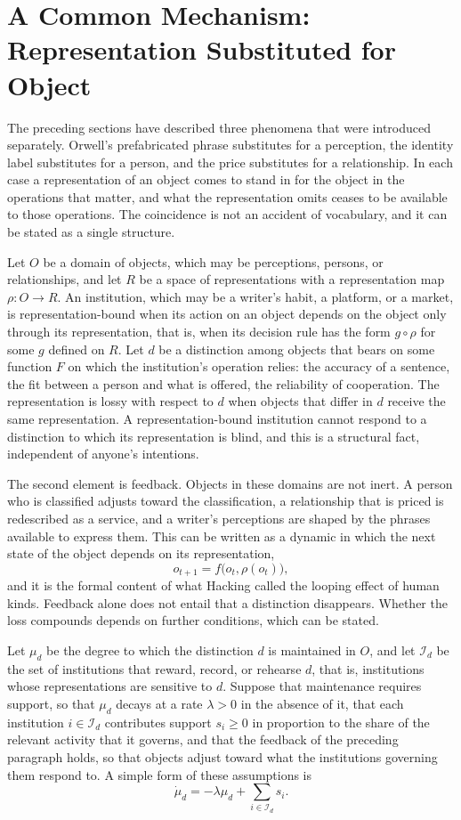 \documentclass[12pt]{article}
\begin{document}
\section{A Common Mechanism: Representation Substituted for Object}
\label{sec:mechanism}

The preceding sections have described three phenomena that were introduced separately. Orwell's prefabricated phrase substitutes for a perception, the identity label substitutes for a person, and the price substitutes for a relationship. In each case a representation of an object comes to stand in for the object in the operations that matter, and what the representation omits ceases to be available to those operations. The coincidence is not an accident of vocabulary, and it can be stated as a single structure.

Let $O$ be a domain of objects, which may be perceptions, persons, or relationships, and let $R$ be a space of representations with a representation map $\rho:O\to R$. An institution, which may be a writer's habit, a platform, or a market, is representation-bound when its action on an object depends on the object only through its representation, that is, when its decision rule has the form $g\circ\rho$ for some $g$ defined on $R$. Let $d$ be a distinction among objects that bears on some function $F$ on which the institution's operation relies: the accuracy of a sentence, the fit between a person and what is offered, the reliability of cooperation. The representation is lossy with respect to $d$ when objects that differ in $d$ receive the same representation. A representation-bound institution cannot respond to a distinction to which its representation is blind, and this is a structural fact, independent of anyone's intentions.

The second element is feedback. Objects in these domains are not inert. A person who is classified adjusts toward the classification, a relationship that is priced is redescribed as a service, and a writer's perceptions are shaped by the phrases available to express them. This can be written as a dynamic in which the next state of the object depends on its representation,
\[
o_{t+1}=f\bigl(o_t,\rho(o_t)\bigr),
\]
and it is the formal content of what Hacking called the looping effect of human kinds. Feedback alone does not entail that a distinction disappears. Whether the loss compounds depends on further conditions, which can be stated.

Let $\mu_d$ be the degree to which the distinction $d$ is maintained in $O$, and let $\mathcal I_d$ be the set of institutions that reward, record, or rehearse $d$, that is, institutions whose representations are sensitive to $d$. Suppose that maintenance requires support, so that $\mu_d$ decays at a rate $\lambda>0$ in the absence of it, that each institution $i\in\mathcal I_d$ contributes support $s_i\ge 0$ in proportion to the share of the relevant activity that it governs, and that the feedback of the preceding paragraph holds, so that objects adjust toward what the institutions governing them respond to. A simple form of these assumptions is
\[
\dot\mu_d=-\lambda\mu_d+\sum_{i\in\mathcal I_d}s_i .
\]
\end{document}
